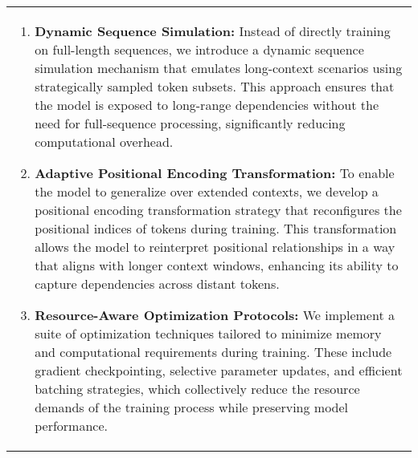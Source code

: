 \begin{table*}[t]
\begin{tabular}{|p{}|}
        \begin{enumerate}
            \item \textbf{Dynamic Sequence Simulation:} Instead of directly training on full-length sequences, we introduce a dynamic sequence simulation mechanism that emulates long-context scenarios using strategically sampled token subsets. This approach ensures that the model is exposed to long-range dependencies without the need for full-sequence processing, significantly reducing computational overhead.
            \item \textbf{Adaptive Positional Encoding Transformation:} To enable the model to generalize over extended contexts, we develop a positional encoding transformation strategy that reconfigures the positional indices of tokens during training. This transformation allows the model to reinterpret positional relationships in a way that aligns with longer context windows, enhancing its ability to capture dependencies across distant tokens.  
            \item \textbf{Resource-Aware Optimization Protocols:} We implement a suite of optimization techniques tailored to minimize memory and computational requirements during training. These include gradient checkpointing, selective parameter updates, and efficient batching strategies, which collectively reduce the resource demands of the training process while preserving model performance. 
        \end{enumerate}  
        

\end{tabular}
\end{table*}
